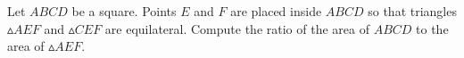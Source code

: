 Let $ABCD$ be a square. Points $E$ and $F$ are placed inside $ABCD$ so that triangles $\vartriangle AEF$ and $\vartriangle CEF$ are equilateral. Compute the ratio of the area of $ABCD$ to the area of $\vartriangle AEF$.
